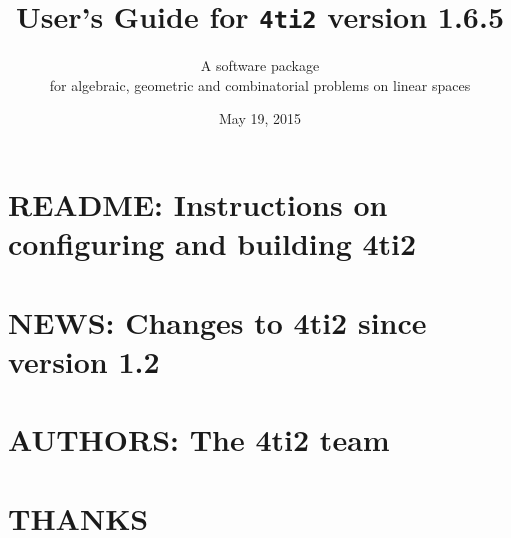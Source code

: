 \documentclass[12pt,a4]{book}
\newcommand{\1}{{\bf 1}}
\newcommand{\FourTiTwo}{{\tt 4ti2}}
\begin{document}
\thispagestyle{empty}

\title{User's Guide for \FourTiTwo{} version 1.6.5}

\author{A software package\\ for algebraic,
geometric and combinatorial problems on linear spaces}
\date{May 19, 2015}

\maketitle

\newpage
\thispagestyle{empty}


\tableofcontents







\chapter{README: Instructions on configuring and building 4ti2}

{\small

}

\chapter{NEWS: Changes to 4ti2 since version 1.2}

{\small

}

\clearpage
{}
\chapter*{AUTHORS: The 4ti2 team}



\clearpage
{}
\chapter*{THANKS}



\clearpage
{}
\providecommand\ISBN{ISBN }



\vfill

\end{document}
